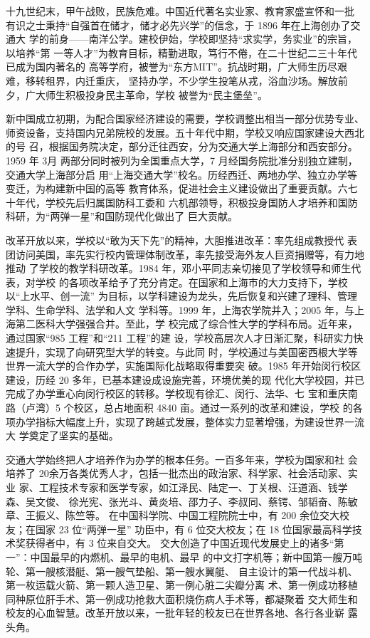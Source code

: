 {\songti 十九世纪末，甲午战败，民族危难。中国近代著名实业家、教育家盛宣怀和一批
  有识之士秉持“自强首在储才，储才必先兴学”的信念，于 1896 年在上海创办了交通大
  学的前身——南洋公学。建校伊始，学校即坚持“求实学，务实业”的宗旨，以培养“第
  一等人才”为教育目标，精勤进取，笃行不倦，在二十世纪二三十年代已成为国内著名的
  高等学府，被誉为“东方MIT”。抗战时期，广大师生历尽艰难，移转租界，内迁重庆，
  坚持办学，不少学生投笔从戎，浴血沙场。解放前夕，广大师生积极投身民主革命，学校
  被誉为“民主堡垒”。}

{\heiti 新中国成立初期，为配合国家经济建设的需要，学校调整出相当一部分优势专业、
  师资设备，支持国内兄弟院校的发展。五十年代中期，学校又响应国家建设大西北的号
  召，根据国务院决定，部分迁往西安，分为交通大学上海部分和西安部分。1959 年 3月
  两部分同时被列为全国重点大学，7 月经国务院批准分别独立建制，交通大学上海部分启
  用“上海交通大学”校名。历经西迁、两地办学、独立办学等变迁，为构建新中国的高等
  教育体系，促进社会主义建设做出了重要贡献。六七十年代，学校先后归属国防科工委和
  六机部领导，积极投身国防人才培养和国防科研，为“两弹一星”和国防现代化做出了
  巨大贡献。}

{\kaishu 改革开放以来，学校以“敢为天下先”的精神，大胆推进改革：率先组成教授代
  表团访问美国，率先实行校内管理体制改革，率先接受海外友人巨资捐赠等，有力地推动
  了学校的教学科研改革。1984 年，邓小平同志亲切接见了学校领导和师生代表，对学校
  的各项改革给予了充分肯定。在国家和上海市的大力支持下，学校以“上水平、创一流”
  为目标，以学科建设为龙头，先后恢复和兴建了理科、管理学科、生命学科、法学和人文
  学科等。1999 年，上海农学院并入；2005 年，与上海第二医科大学强强合并。至此，学
  校完成了综合性大学的学科布局。近年来，通过国家“985 工程”和“211 工程”的建
  设，学校高层次人才日渐汇聚，科研实力快速提升，实现了向研究型大学的转变。与此同
  时，学校通过与美国密西根大学等世界一流大学的合作办学，实施国际化战略取得重要突
  破。1985 年开始闵行校区建设，历经 20 多年，已基本建设成设施完善，环境优美的现
  代化大学校园，并已完成了办学重心向闵行校区的转移。学校现有徐汇、闵行、法华、七
  宝和重庆南路（卢湾）5 个校区，总占地面积 4840 亩。通过一系列的改革和建设，学校
  的各项办学指标大幅度上升，实现了跨越式发展，整体实力显著增强，为建设世界一流大
  学奠定了坚实的基础。}

{\fangsong 交通大学始终把人才培养作为办学的根本任务。一百多年来，学校为国家和社
  会培养了 20余万各类优秀人才，包括一批杰出的政治家、科学家、社会活动家、实业
  家、工程技术专家和医学专家，如江泽民、陆定一、丁关根、汪道涵、钱学森、吴文俊、
  徐光宪、张光斗、黄炎培、邵力子、李叔同、蔡锷、邹韬奋、陈敏章、王振义、陈竺等。
  在中国科学院、中国工程院院士中，有 200 余位交大校友；在国家 23 位“两弹一星”
  功臣中，有 6 位交大校友；在 18 位国家最高科学技术奖获得者中，有 3 位来自交大。
  交大创造了中国近现代发展史上的诸多“第一”：中国最早的内燃机、最早的电机、最早
  的中文打字机等；新中国第一艘万吨轮、第一艘核潜艇、第一艘气垫船、第一艘水翼艇、
  自主设计的第一代战斗机、第一枚运载火箭、第一颗人造卫星、第一例心脏二尖瓣分离
  术、第一例成功移植同种原位肝手术、第一例成功抢救大面积烧伤病人手术等，都凝聚着
  交大师生和校友的心血智慧。改革开放以来，一批年轻的校友已在世界各地、各行各业崭
  露头角。}

